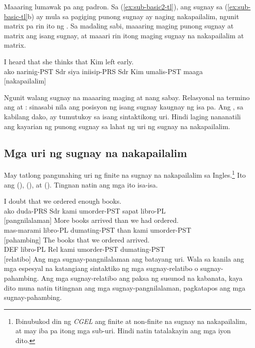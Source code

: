 Maaaring lumawak pa ang padron. Sa (\ref{ex:sub-basic2-tl}), ang sugnay sa (\ref{ex:sub-basic-tl}b) ay mula sa pagiging punong sugnay ay naging nakapailalim, ngunit matrix pa rin ito ng . Sa madaling sabi, maaaring maging punong sugnay at matrix ang isang sugnay, at maaari rin itong maging sugnay na nakapailalim at matrix.

\ea\label{ex:sub-basic2-tl}
\gll I heard {\ob}that she thinks {\ob}that Kim left early{\cb}{\cb}.\\
    ako narinig-PST Sdr siya iniisip-PRS Sdr Kim umalis-PST maaga\\
\glt {} [nakapailalim]
\z

Ngunit walang sugnay na maaaring maging  at  nang sabay. Relasyonal na termino ang  at : sinasabi nila ang posisyon ng isang sugnay kaugnay ng isa pa. Ang , sa kabilang dako, ay tumutukoy sa isang sintaktikong uri. Hindi laging nananatili ang kayarian ng punong sugnay sa lahat ng uri ng sugnay na nakapailalim.

\subsection{Mga uri ng sugnay na nakapailalim}

May tatlong pangunahing uri ng finite na sugnay na nakapailalim sa Ingles.\footnote{Ibinubukod din ng \textit{CGEL} ang finite at non-finite na sugnay na nakapailalim, at may iba pa itong mga sub-uri. Hindi natin tatalakayin ang mga iyon dito.} Ito ang  (),  (), at  (). Tingnan natin ang mga ito isa-isa.

\ea \label{ex:sub-types-tl}
    \ea \gll I doubt that we ordered enough books.\\
        ako duda-PRS Sdr kami umorder-PST sapat libro-PL\\
    \glt {} [pangnilalaman]
    \ex \gll More books arrived than we had ordered.\\
        mas-marami libro-PL dumating-PST than kami umorder-PST\\
    \glt {} [pahambing]
    \ex \gll The books that we ordered arrived.\\
        DEF libro-PL Rel kami umorder-PST dumating-PST\\
    \glt {} [relatibo]
    \z
\z
Ang mga sugnay-pangnilalaman ang batayang uri. Wala sa kanila ang mga espesyal na katangiang sintaktiko ng mga sugnay-relatibo o sugnay-pahambing. Ang mga sugnay-relatibo ang paksa ng susunod na kabanata, kaya dito muna natin titingnan ang mga sugnay-pangnilalaman, pagkatapos ang mga sugnay-pahambing.

